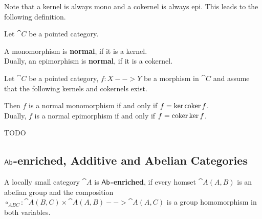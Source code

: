 	Note that a kernel is always mono and a cokernel is always epi. This leads to the following definition.

	\begin{definition}
		Let $\cat{C}$ be a pointed category.

		A monomorphism is \textbf{normal}, if it is a kernel.\\
		Dually, an epimorphism is \textbf{normal}, if it is a cokernel.
	\end{definition}

	\begin{lemma}
		Let $\cat{C}$ be a pointed category, $f:X-->Y$ be a morphism in $\cat{C}$ and assume that the following kernels and cokernels exist.

		Then $f$ is a normal monomorphism if and only if $f = \ker \operatorname{coker} f$.\\
		Dually, $f$ is a normal epimorphism if and only if $f = \operatorname{coker} \ker f$.
	\end{lemma}
	\begin{sketch}
		TODO
	\end{sketch}

	\subsection{$\textsf{Ab}$-enriched, Additive and Abelian Categories}

	\begin{definition}
		A locally small category $\cat{A}$ is \textbf{$\textsf{Ab}$-enriched}, if every homset $\cat{A}(A,B)$ is an abelian group and the composition $\circ_{ABC}: \cat{A}(B,C) \times \cat{A}(A,B) --> \cat{A}(A,C)$ is a group homomorphism in both variables.
	\end{definition}

